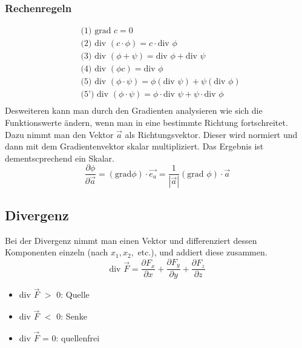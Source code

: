 \documentclass[a4paper,10pt]{scrartcl}
\begin{document}
        \subsubsection*{Rechenregeln}
        \begin{equation*}
            \begin{aligned}
                & \text{(1) } \text{grad } c = 0 \\
                & \text{(2) } \text{div } (c \cdot \phi) = c \cdot \text{div }\phi \\
                & \text{(3) } \text{div } (\phi + \psi) = \text{div } \phi + \text{div } \psi \\
                & \text{(4) } \text{div } (\phi c) = \text{div } \phi \\
                & \text{(5) } \text{div } (\phi \cdot \psi)= \phi(\text{div } \psi) + \psi(\text{div } \phi) \\
                & \text{(5') } \text{div } (\phi \cdot \psi)= \phi \cdot \text{div } \psi + \psi \cdot \text{div } \phi \\
            \end{aligned}
        \end{equation*}
        Desweiteren kann man durch den Gradienten analysieren wie sich die Funktionswerte ändern, wenn man in eine bestimmte Richtung fortschreitet. Dazu nimmt man den
        Vektor \(\vec{a}\) als Richtungsvektor. Dieser wird normiert und dann mit dem Gradientenvektor skalar multipliziert. Das Ergebnis ist dementscprechend ein Skalar. 
        \begin{equation*}
            \frac{\partial \phi}{\partial \vec{a}} = (\text{grad}  \phi) \cdot \vec{e_a} = \frac{1}{|\vec{a}|} (\text{grad } \phi) \cdot \vec{a}
        \end{equation*}
        
        \subsection{Divergenz}
        Bei der Divergenz nimmt man einen Vektor und differenziert dessen Komponenten einzeln (nach \(x_1, x_2,\) etc.), und addiert diese zusammen. 
        \begin{equation*}
            \text{div } \vec{F} = \frac{\partial F_x}{\partial x} + \frac{\partial F_y}{\partial y} +\frac{\partial F_z}{\partial z}
        \end{equation*} 
        \begin{itemize}
            \item div \(\vec{F}\) \(>\) 0: Quelle
            \item div \(\vec{F}\) \(<\) 0: Senke
            \item div \(\vec{F}\) = 0: quellenfrei 
        \end{itemize}
\end{document}
